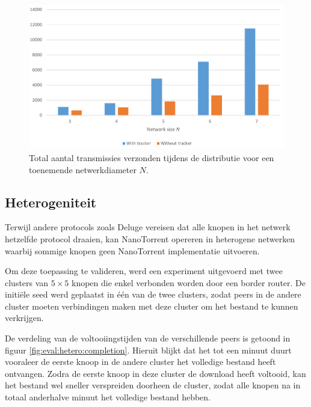 \documentclass[journal]{IEEEtran}
\begin{document}
\begin{figure}
    \centering
    \includegraphics[width=\linewidth]{graphs/scale/total-transmissions.pdf}
    \caption{Total aantal transmissies verzonden tijdens de distributie voor een toenemende netwerkdiameter $N$.}
    \label{fig:eval:scale:total-transmissions}
\end{figure}

\subsection{Heterogeniteit}
Terwijl andere protocols zoals Deluge \cite{deluge} vereisen dat alle knopen in het netwerk hetzelfde protocol draaien, kan NanoTorrent opereren in heterogene netwerken waarbij sommige knopen geen NanoTorrent implementatie uitvoeren.

Om deze toepassing te valideren, werd een experiment uitgevoerd met twee clusters van $5 \times 5$ knopen die enkel verbonden worden door een border router. De initi\"ele seed werd geplaatst in \'e\'en van de twee clusters, zodat peers in de andere cluster moeten verbindingen maken met deze cluster om het bestand te kunnen verkrijgen.

De verdeling van de voltooiingstijden van de verschillende peers is getoond in figuur \ref{fig:eval:hetero:completion}. Hieruit blijkt dat het tot een minuut duurt vooraleer de eerste knoop in de andere cluster het volledige bestand heeft ontvangen. Zodra de eerste knoop in deze cluster de download heeft voltooid, kan het bestand wel sneller verspreiden doorheen de cluster, zodat alle knopen na in totaal anderhalve minuut het volledige bestand hebben.
\end{document}
